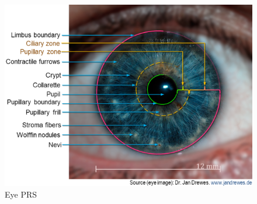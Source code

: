 \documentclass{beamer}
\begin{document}
\begin{frame}
\begin{itemize}
\begin{itemize}
\begin{columns}
\begin{column}{.4\textwidth}
\begin{figure}
\includegraphics[width=\textwidth]{eye.png}
\caption {Eye PRS}
\end{figure}
\end{column}
\end{columns}
\end{itemize}
\end{itemize}
\end{frame}
\end{document}
